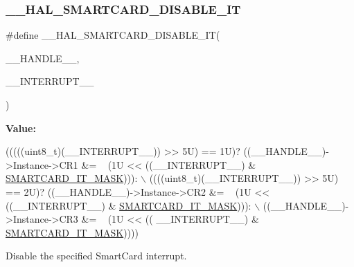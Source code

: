 \subsubsection{\texorpdfstring{\+\_\+\+\_\+\+H\+A\+L\+\_\+\+S\+M\+A\+R\+T\+C\+A\+R\+D\+\_\+\+D\+I\+S\+A\+B\+L\+E\+\_\+\+IT}{\_\_HAL\_SMARTCARD\_DISABLE\_IT}}
{\footnotesize\ttfamily \#define \+\_\+\+\_\+\+H\+A\+L\+\_\+\+S\+M\+A\+R\+T\+C\+A\+R\+D\+\_\+\+D\+I\+S\+A\+B\+L\+E\+\_\+\+IT(\begin{DoxyParamCaption}\item[{}]{\+\_\+\+\_\+\+H\+A\+N\+D\+L\+E\+\_\+\+\_\+,  }\item[{}]{\+\_\+\+\_\+\+I\+N\+T\+E\+R\+R\+U\+P\+T\+\_\+\+\_\+ }\end{DoxyParamCaption})}

{\bfseries Value\+:}
\begin{DoxyCode}
(((((uint8\_t)(\_\_INTERRUPT\_\_)) >> 5U) == 1U)? ((\_\_HANDLE\_\_)->Instance->CR1 &= ~ (1U << ((\_\_INTERRUPT\_\_) & 
      \hyperlink{group___s_m_a_r_t_c_a_r_d___interruption___mask_ga2d4be8e0259fd370f82c53579c96ede5}{SMARTCARD\_IT\_MASK}))): \(\backslash\)
                                                                ((((uint8\_t)(\_\_INTERRUPT\_\_)) >> 5U) == 2U)?
       ((\_\_HANDLE\_\_)->Instance->CR2 &= ~ (1U << ((\_\_INTERRUPT\_\_) & \hyperlink{group___s_m_a_r_t_c_a_r_d___interruption___mask_ga2d4be8e0259fd370f82c53579c96ede5}{SMARTCARD\_IT\_MASK}))): \(\backslash\)
                                                                ((\_\_HANDLE\_\_)->Instance->CR3 &= ~ (1U << ((
      \_\_INTERRUPT\_\_) & \hyperlink{group___s_m_a_r_t_c_a_r_d___interruption___mask_ga2d4be8e0259fd370f82c53579c96ede5}{SMARTCARD\_IT\_MASK}))))
\end{DoxyCode}


Disable the specified Smart\+Card interrupt. 


